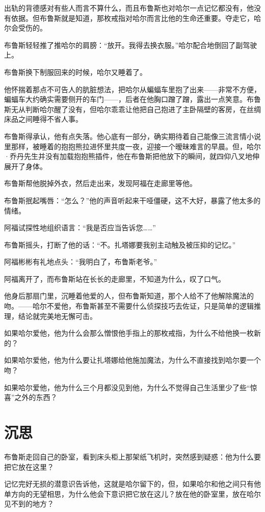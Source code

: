 \documentclass[../main.tex]{subfiles}
\begin{document}
出轨的背德感对有些人而言不算什么，而且布鲁斯也对哈尔一点记忆都没有，他没有依据。但布鲁斯就是知道，那枚戒指对哈尔而言比他的生命还重要。夺走它，哈尔会受伤的。

布鲁斯轻轻推了推哈尔的肩膀：“放开。我得去换衣服。”哈尔配合地倒回了副驾驶上。

布鲁斯换下制服回来的时候，哈尔又睡着了。

他怀揣着那点不可告人的肮脏想法，把哈尔从蝙蝠车里抱了出来——非常不方便，蝙蝠车大约确实需要侧开的车门——，后者在他胸口蹭了蹭，露出一点笑意。布鲁斯无从判断哈尔醒了没有，但哈尔乖乖让他把自己抱进了主卧隔壁的客房，在丝绸床品之间睡得不省人事。

布鲁斯得承认，他有点失落。他心底有一部分，确实期待着自己能像三流言情小说里那样，被睡着的抱抱熊拉进怀里共度一夜，迎接一个暧昧难言的早晨。但，哈尔·乔丹先生并没有加载抱抱熊插件，他在布鲁斯把他放下的瞬间，就四仰八叉地伸展开了身体。

布鲁斯帮他脱掉外衣，然后走出来，发现阿福在走廊里等他。

布鲁斯抿起嘴唇：“怎么？”他的声音听起来干哑僵硬，这不大好，暴露了他太多的情绪。

阿福试探性地组织语言：“我是否应当告诉您……”

布鲁斯摇头，打断了他的话：“不。扎塔娜要我别主动触及被压抑的记忆。”

阿福彬彬有礼地点头：“我明白了，布鲁斯老爷。”

阿福离开了，而布鲁斯站在长长的走廊里，不知道为什么，叹了口气。

他身后那扇门里，沉睡着他爱的人，但布鲁斯知道，那个人给不了他解除魔法的吻。——哈尔不爱他，布鲁斯甚至不需要什么侦探技巧去佐证，只是简单的逻辑推理，结论就完美地无懈可击。

如果哈尔爱他，他为什么会那么憎恨他手指上的那枚戒指，为什么不给他换一枚新的？

如果哈尔爱他，他为什么要让扎塔娜给他施加魔法，为什么不直接找到哈尔要一个吻？

如果哈尔爱他，他为什么三个月都没见到他，为什么不觉得自己生活里少了些“惊喜”之外的东西？

\section{沉思}

布鲁斯走回自己的卧室，看到床头柜上那架纸飞机时，突然感到疑惑：他为什么要把它放在这里？

记忆完好无损的潜意识告诉他，这就是哈尔留下的，但，如果哈尔和他之间只有他单方向的无望相思，为什么他会下意识把它放在这儿？放在他的卧室里，放在哈尔见不到的地方？
\end{document}

